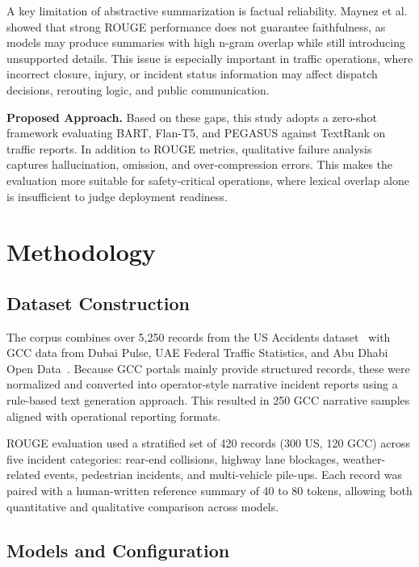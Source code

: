 \documentclass[10pt,conference]{IEEEtran}
\begin{document}
A key limitation of abstractive summarization is factual reliability.
Maynez et al. showed that strong ROUGE performance does
not guarantee faithfulness, as models may produce summaries with high
n-gram overlap while still introducing unsupported details. This issue is
especially important in traffic operations, where incorrect closure,
injury, or incident status information may affect dispatch decisions,
rerouting logic, and public communication.

\textbf{Proposed Approach.}
Based on these gaps, this study adopts a zero-shot framework
evaluating BART, Flan-T5, and PEGASUS against TextRank on traffic reports. In addition to ROUGE
metrics, qualitative failure analysis captures hallucination, omission, and over-compression errors. This makes
the evaluation more suitable for safety-critical operations,
where lexical overlap alone is insufficient to judge deployment readiness.

\section{Methodology}
\vspace{-1mm}
\subsection{Dataset Construction}
\vspace{-1mm}

The corpus combines over 5,250 records from the US Accidents
dataset~\cite{moosavi2023} with GCC data from Dubai Pulse, UAE Federal
Traffic Statistics, and Abu Dhabi Open Data~\cite{dubaipulse2023}.
Because GCC portals mainly provide structured records, these were
normalized and converted into operator-style narrative incident reports
using a rule-based text generation approach. This resulted in 250 GCC narrative samples aligned
with operational reporting formats.

ROUGE evaluation used a stratified set of 420 records (300 US, 120 GCC)
across five incident categories: rear-end collisions, highway lane
blockages, weather-related events, pedestrian incidents, and
multi-vehicle pile-ups. Each record was paired with a human-written
reference summary of 40 to 80 tokens, allowing both quantitative and
qualitative comparison across models.

\subsection{Models and Configuration}
\vspace{-1mm}
\end{document}
